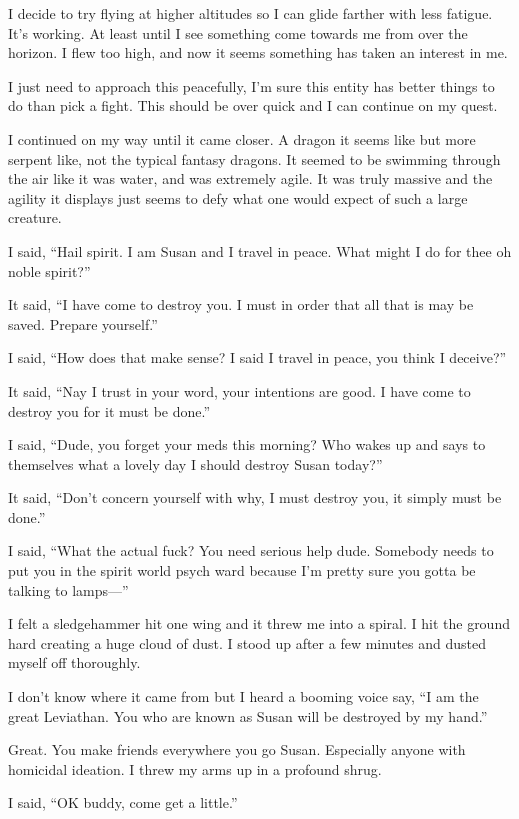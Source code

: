I decide to try flying at higher altitudes so I can glide farther with less fatigue. It's working. At least until I see something come towards me from over the horizon. I flew too high, and now it seems something has taken an interest in me.

I just need to approach this peacefully, I'm sure this entity has better things to do than pick a fight. This should be over quick and I can continue on my quest.

I continued on my way until it came closer. A dragon it seems like but more serpent like, not the typical fantasy dragons. It seemed to be swimming through the air like it was water, and was extremely agile. It was truly massive and the agility it displays just seems to defy what one would expect of such a large creature.

I said, ``Hail spirit. I am Susan and I travel in peace. What might I do for thee oh noble spirit?''

It said, ``I have come to destroy you. I must in order that all that is may be saved. Prepare yourself.''

I said, ``How does that make sense? I said I travel in peace, you think I deceive?''

It said, ``Nay I trust in your word, your intentions are good. I have come to destroy you for it must be done.''

I said, ``Dude, you forget your meds this morning? Who wakes up and says to themselves what a lovely day I should destroy Susan today?''

It said, ``Don't concern yourself with why, I must destroy you, it simply must be done.''

I said, ``What the actual fuck? You need serious help dude. Somebody needs to put you in the spirit world psych ward because I'm pretty sure you gotta be talking to lamps---''

I felt a sledgehammer hit one wing and it threw me into a spiral. I hit the ground hard creating a huge cloud of dust. I stood up after a few minutes and dusted myself off thoroughly.

I don't know where it came from but I heard a booming voice say, ``I am the great Leviathan. You who are known as Susan will be destroyed by my hand.''

Great. You make friends everywhere you go Susan. Especially anyone with homicidal ideation. I threw my arms up in a profound shrug.

I said, ``OK buddy, come get a little.''

